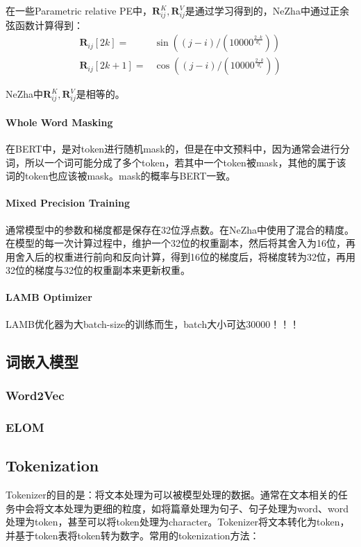 在一些Parametric relative PE中，$\boldsymbol{R}_{ij}^K, \boldsymbol{R}_{ij}^V$是通过学习得到的，NeZha中通过正余弦函数计算得到：
$$
\begin{equation}
	\begin{aligned}
		\boldsymbol{R}_{ij}[2 k] =& \sin \left((j-i) /\left(10000^{\frac{2 \cdot k}{d_{z}}}\right)\right) \\
		\boldsymbol{R}_{ij}[2 k+1] =& \cos \left((j-i) /\left(10000^{\frac{2 \cdot k}{d_{z}}}\right)\right)
	\end{aligned}
\end{equation}
$$

NeZha中$\boldsymbol{R}_{ij}^K, \boldsymbol{R}_{ij}^V$是相等的。

\paragraph{Whole Word Masking}
在BERT中，是对token进行随机mask的，但是在中文预料中，因为通常会进行分词，所以一个词可能分成了多个token，若其中一个token被mask，其他的属于该词的token也应该被mask。mask的概率与BERT一致。

\paragraph{Mixed Precision Training}
通常模型中的参数和梯度都是保存在32位浮点数。在NeZha中使用了混合的精度。在模型的每一次计算过程中，维护一个32位的权重副本，然后将其舍入为16位，再用舍入后的权重进行前向和反向计算，得到16位的梯度后，将梯度转为32位，再用32位的梯度与32位的权重副本来更新权重。

\paragraph{LAMB Optimizer}
LAMB优化器为大batch-size的训练而生，batch大小可达30000！！！

\subsection{词嵌入模型}
\subsubsection{Word2Vec}

\subsubsection{ELOM}

\subsection{Tokenization}
Tokenizer的目的是：将文本处理为可以被模型处理的数据。通常在文本相关的任务中会将文本处理为更细的粒度，如将篇章处理为句子、句子处理为word、word处理为token，甚至可以将token处理为character。Tokenizer将文本转化为token，并基于token表将token转为数字。常用的tokenization方法：
